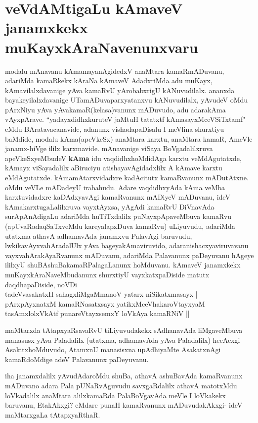 \section*{veVdAMtigaLu kAmaveV janamxkekx muKayxkAraNavenunxvaru}


\begin{artha}
modalu mAnavanu kAmamayanAgidedxV anaMtara kamaRmADuvanu, adariMda kamaRkekx kAraNa kAmaveV AdadxriMda adu muKayx, kAmavilalxdavanige yAva kamaRvU yArobabxrigU kANuvudilalx. ananxda bayakeyilalxdavanige UTamADuvaparxyatanxvu kANuvudilalx, yAvudeV oMdu pArxNiyu  yAva yAvakamaR(kelasa)vanunx mADuvudo, adu adarakAma vAyxpArave. ``yadayxdidhxkuruteV jaMtuH tatatxtf kAmasayxMceVSiTxtamf" eMdu BAratavacanavide, adanunx vishadapaDisalu I meVlina shurxtiyu baMdide, modalu kAma(apeVkeSx) anaMtara karxtu, anaMtara kamaR, AmeVle janamx-hiVge ililx karxmavide.
mAnavanige viSaya BoVgadalilxruva apeVkeSxyeMbudeV \textbf{kAma} idu vaqdidhxhoMdidAga karxtu veMdAgutatxde, kAmayx viSayadalilx aBiruciyu atishayavAgidadxlilx A kAmave karxtu eMdAgutatxde. kAmamAtarxvidadxre kadAcitutx kamaRvanunx mADutAtxne. oMdu veVLe  mADadeyU irabahudu. Adare vaqdidhxyAda kAma veMba karxtuvidadxre kaDAdxyavAgi kamaRvanunx mADiyeV mADuvanu, ideV kAmakarxtugaLalilxruva vayxtAyxsa, yAgAdi kamaRvU DiVnavAda surApAnAdigaLu adariMda huTiTxdalilx puNayxpApaveMbuva kamaRvu (apUvaRadaqSaTxveMdu kareyalapxDuva kamaRvu) uLiyuvudu, adariMda utatxma athavA adhamavAda janamxvu PalavAgi baruvudu, lwkikavAyxvahAradalUlx yAva bageyakAmaviruvido, adaranishacxyaviruvavanu vayxvahArakAyaRvanunx mADuvanu, adariMda Palavanunx paDeyuvanu hAgeye ililxyU shuBAshuBakamaRPalagaLanunx hoMduvanu. kAmaveV janamxkekx muKayxkAraNaveMbudanunx shurxtiyU vayxkatxpaDiside matutx daqdhapaDiside, noVDi\ndash \\
tadeVvasakatxH sahagxliMgaMmanoV yatarx niSikatxmasayx |\\
pArxpAyxnatxM kamaRNasatxsayx yatikxMceVhakaroVtayxyaM\\ 
tasAmxlolxVkAtf punareVtayxsemxY loVkAya kamaRNiV ||
\end{artha}

\begin{artha}
maMtarxda tAtapxyaR\ndash  savaRvU tiLiyuvudakekx sAdhanavAda liMgaveMbuva manasusx yAva Paladalilx (utatxma, adhamavAda yAva Paladalilx) hecAcxgi AsakitxhoMduvudo, AtamxnU manasisxna upAdhiyaMte AsakatxnAgi kamaRdoMdige adeV Palavanunx paDeyuvanu.

iha janamxdalilx yAvudAdaroMdu shuBa, athavA ashuBavAda kamaRvanunx mADuvano adara Pala pUNaRvAguvudu savxgaRdalilx athavA matotxMdu loVkadalilx anaMtara alilxkamaRda PalaBoVgavAda meVle I loVkakekx baruvanu, EtakAkxgi? eMdare punaH kamaRvanunx mADuvudakAkxgi- ideV maMtarxgaLa tAtapxyaRthaR.
\end{artha}

